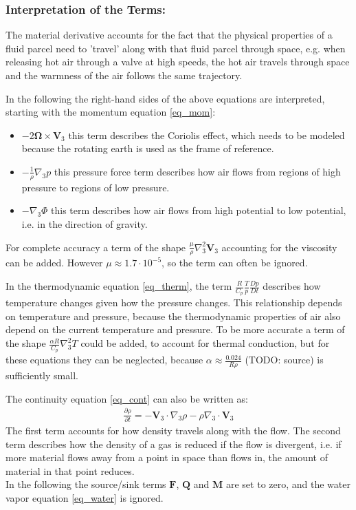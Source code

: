 \subsubsection{Interpretation of the Terms:}
The material derivative accounts for the fact that the physical properties of a fluid parcel need to 'travel' along with that fluid parcel through space, e.g. when releasing hot air through a valve at high speeds, the hot air travels through space and the warmness of the air follows the same trajectory.

In the following the right-hand sides of the above equations are interpreted, starting with the momentum equation \ref{eq_mom}:
\begin{itemize}
\item $-2\boldsymbol{\Omega}\times \textbf{V}_3$ this term describes the Coriolis effect, which needs to be modeled because the rotating earth is used as the frame of reference.
\item $- \frac{1}{\rho}\nabla _3 p$ this pressure force term describes how air flows from regions of high pressure to regions of low pressure.
\item $- \nabla _3 \Phi$ this term describes how air flows from high  potential to low potential, i.e. in the direction of gravity.
\end{itemize}
For complete accuracy a term of the shape $\frac{\mu}{\rho} \nabla _3^2 \textbf{V}_3$ accounting for the viscosity can be added.
However $\mu \approx 1.7\cdot 10^{-5}$, so the term can often be ignored.

In the thermodynamic equation \ref{eq_therm}, the term $\frac{R}{C_p}\frac{T}{p}\frac{Dp}{Dt}$ describes how temperature changes given how the pressure changes.
This relationship depends on temperature and pressure, because the thermodynamic properties of air also depend on the current temperature and pressure.
To be more accurate a term of the shape $\frac{\alpha R}{C_p}\nabla _3^2 T$ could be added, to account for thermal conduction, but for these equations they can be neglected, because $\alpha \approx \frac{0.024}{R\rho}$ (TODO: source) is sufficiently small.

The continuity equation \ref{eq_cont} can also be written as:
\begin{align*}
\frac{\partial \rho}{\partial t} =  - \textbf{V}_3 \cdot \nabla _3 \rho -\rho \nabla _3 \cdot \textbf{V}_3 
\end{align*}
The first term accounts for how density travels along with the flow.
The second term describes how the density of a gas is reduced if the flow is divergent, i.e. if more material flows away from a point in space than flows in, the amount of material in that point reduces.\\
In the following the source/sink terms $\textbf{F}$, $\textbf{Q}$ and $\textbf{M}$ are set to zero, and the water vapor equation \ref{eq_water} is ignored.


